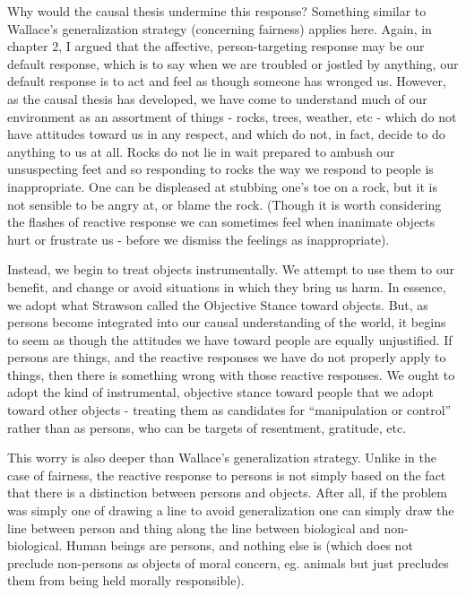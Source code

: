 \documentclass[phd,12pt,oneside,paper=letterpaper]{ubcthesis}
\begin{document}
Why would the causal thesis undermine this response? Something similar to Wallace's generalization strategy (concerning fairness) applies here. Again, in chapter 2, I argued that the affective, person-targeting response may be our default response, which is to say when we are troubled or jostled by anything, our default response is to act and feel as though someone has wronged us. However, as the causal thesis has developed, we have come to understand much of our environment as an assortment of things - rocks, trees, weather, etc - which do not have attitudes toward us in any respect, and which do not, in fact, decide to do anything to us at all. Rocks do not lie in wait prepared to ambush our unsuspecting feet and so responding to rocks the way we respond to people is inappropriate. One can be displeased at stubbing one's toe on a rock, but it is not sensible to be angry at, or blame the rock. (Though it is worth considering the flashes of reactive response we can sometimes feel when inanimate objects hurt or frustrate us - before we dismiss the feelings as inappropriate). 

Instead, we begin to treat objects instrumentally. We attempt to use them to our benefit, and change or avoid situations in which they bring us harm. In essence, we adopt what Strawson called the Objective Stance \citep{strawsonp1974} toward objects. But, as persons become integrated into our causal understanding of the world, it begins to seem as though the attitudes we have toward people are equally unjustified. If persons are things, and the reactive responses we have do not properly apply to things, then there is something wrong with those reactive responses. We ought to adopt the kind of instrumental, objective stance toward people that we adopt toward other objects - treating them as candidates for ``manipulation or control'' rather than as persons, who can be targets of resentment, gratitude, etc. 

This worry is also deeper than Wallace's generalization strategy. Unlike in the case of fairness, the reactive response to persons is not simply based on the fact that there is a distinction between persons and objects. After all, if the problem was simply one of drawing a line to avoid generalization one can simply draw the line between person and thing along the line between biological and non-biological. Human beings are persons, and nothing else is (which does not preclude non-persons as objects of moral concern, eg. animals but just precludes them from being held morally responsible).
\end{document}
